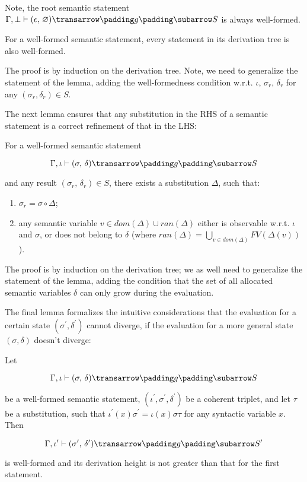Note, the root semantic statement \mbox{$\otrans{\Gamma,\bot}{(\epsilon,\,\emptyset)}{g}{S}$} is always well-formed.

\begin{lemma}
\label{one}
\normalfont
 For a well-formed semantic statement, every statement in its derivation tree is also well-formed.
\end{lemma}

The proof is by induction on the derivation tree. Note, we need to generalize the statement of the lemma, adding the well-formedness
condition w.r.t. $\iota$, $\sigma_r$, $\delta_r$ for any $(\sigma_r, \delta_r) \in S$.

The next lemma ensures that any substitution in the RHS of a semantic statement is a correct refinement of that in the LHS:

\begin{lemma}
\label{two}
\normalfont
For a well-formed semantic statement 

$$
\otrans{\Gamma,\iota}{(\sigma,\,\delta)}{g}{S}
$$ 

\noindent and any result \mbox{$(\sigma_r,\,\delta_r) \in S$}, there exists a substitution $\Delta$, such that:
  \begin{enumerate}
    \item \mbox{$\sigma_r = \sigma\circ\Delta$};
    \item any semantic variable \mbox{$v\in dom(\Delta)\cup ran(\Delta)$} either is observable w.r.t. $\iota$ and $\sigma$,
 or does not belong to $\delta$ (where \mbox{$ran(\Delta)=\bigcup_{v\in dom(\Delta)}FV(\Delta(v))$}).
  \end{enumerate}   
\end{lemma}

The proof is by induction on the derivation tree; we as well need to generalize the statement of the lemma, adding the condition that the 
set of all allocated semantic variables $\delta$ can only grow during the evaluation.

The final lemma formalizes the intuitive considerations that the evaluation for a certain state $(\sigma^\prime,\delta^\prime)$ cannot
diverge, if the evaluation for a more general state $(\sigma,\delta)$ doesn't diverge:

\begin{lemma}
\label{three}
\normalfont
Let 

$$
\otrans{\Gamma,\iota}{(\sigma,\,\delta)}{g}{S}
$$ 

\noindent be a well-formed semantic statement, \mbox{$(\iota^\prime,\sigma^\prime,\delta^\prime)$} be a coherent triplet,
and let $\tau$ be a substitution, such that \mbox{$\iota^\prime(x) \sigma^\prime = \iota(x) \sigma \tau$} for any syntactic
variable $x$. Then

$$
\otrans{\Gamma,\iota^\prime}{(\sigma^\prime,\,\delta^\prime)}{g}{S^\prime}
$$

\noindent is well-formed and its derivation height is not greater than that for the first statement.
\end{lemma}

